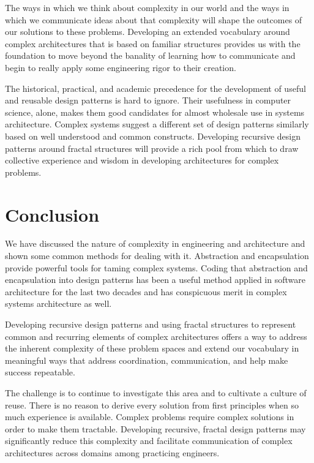 \documentclass[jou,apacite]{apa6}
\begin{document}
The ways in which we think about complexity in our world and the ways in which we communicate ideas about that complexity will shape the outcomes of our solutions to these problems.  Developing an extended vocabulary around complex architectures that is based on familiar structures provides us with the foundation to move beyond the banality of learning how to communicate and begin to really apply some engineering rigor to their creation.

The historical, practical, and academic precedence for the development of useful and reusable design patterns is hard to ignore.  Their usefulness in computer science, alone, makes them good candidates for almost wholesale use in systems architecture.  Complex systems suggest a different set of design patterns similarly based on well understood and common constructs.  Developing recursive design patterns around fractal structures will provide a rich pool from which to draw collective
experience and wisdom in developing architectures for complex problems.

\section{Conclusion}  %
We have discussed the nature of complexity in engineering and architecture and shown some common methods for dealing with it.  Abstraction and encapsulation provide powerful tools for taming complex systems.  Coding that abstraction and encapsulation into design patterns has been a useful method applied in software architecture for the last two decades and has conspicuous merit in complex systems architecture as well.

Developing recursive design patterns and using fractal structures to represent common and recurring elements of complex architectures offers a way to address the inherent complexity of these problem spaces and extend our vocabulary in meaningful ways that address coordination, communication, and help make success repeatable.

The challenge is to continue to investigate this area and to cultivate a culture of reuse.  There is no reason to derive every solution from first principles when so much experience is available.  Complex problems require complex solutions in order to make them tractable.  Developing recursive, fractal design patterns may significantly reduce this complexity and facilitate communication of complex architectures across domains among practicing engineers.


\end{document}
